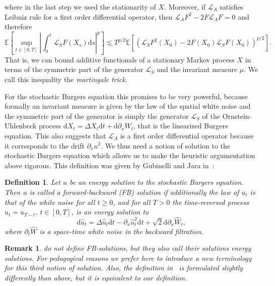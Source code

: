 \documentclass[a4paper,11pt]{article}
\newcommand{\mathd}{\mathrm{d}}
\newcommand{\tmtextit}[1]{{\itshape{#1}}}
\newtheorem{definition}[theorem]{Definition}
\newtheorem{remark}[theorem]{Remark}
\newcommand{\1}{\mathds{1}}
\newcommand{\dd}{\mathrm{d}}
\begin{document}
where in the last step we used the stationarity of $X$. Moreover, if
$\mathcal{L}_A$ satisfies Leibniz rule for a first order differential
operator, then $\mathcal{L}_AF^2  - 2 F  \mathcal{L}_A F = 0$ and therefore
\[ \mathbb{E} \left[ \sup_{t \in [0, T]} \left| \int_0^t \mathcal{L}_S F
   (X_s) \mathd s \right|^p \right] \lesssim T^{p / 2} \mathbb{E}
   [(\mathcal{L}_S F^2 (X_0) - 2 F (X_0) \mathcal{L}_S F (X_0))^{p / 2}] . \]
That is, we can bound additive functionals of a stationary Markov process $X$
in terms of the symmetric part of the generator $\mathcal{L}_S$ and the
invariant measure $\mu$. We call this inequality the \tmtextit{martingale trick}.

For the stochastic Burgers equation this promises to be very powerful, because
formally an invariant measure is given by the law of the spatial white noise and the symmetric part of the generator is simply
the generator $\mathcal{L}_S$ of the Ornstein-Uhlenbeck process $\dd X_t = \Delta X_t \dd t + \dd \partial_x  W_t$, that is the linearized Burgers equation. This also suggests that
$\mathcal{L}_A$ is a first order differential operator because it corresponds
to the drift $\partial_x u^2$. We thus need a notion of solution to the
stochastic Burgers equation which allows us to make the heuristic
argumentation above rigorous. This definition was given by Gubinelli and Jara
in~{\cite{GJ13}}:

\begin{definition}
  Let $u$ be an energy solution to the stochastic Burgers equation. Then $u$
  is called a \tmtextit{forward-backward (FB) solution} if additionally the
  law of $u_t$ is that of the white noise for all $t \geqslant 0$, and for all
  $T > 0$ the time-reversed process $\hat{u}_t = u_{T - t}$, $t \in [0, T]$,
  is an energy solution to
  \[ \dd \hat{u}_t = \Delta \hat{u}_t \dd t - \partial_x \hat{u}^2_t \dd t + \sqrt{2} \dd \partial_x
     \hat{W}_t, \]
  where $\partial_t \hat{W}$ is a space-time white noise in the backward filtration.
\end{definition}

\begin{remark}
  {\cite{GJ13}} do not define FB-solutions, but they also call their
  solutions energy solutions. For pedagogical reasons we prefer here to
  introduce a new terminology for this third notion of solution. Also, the
  definition in~{\cite{GJ13}} is formulated slightly differently than
  above, but it is equivalent to our definition.
\end{remark}
\end{document}
